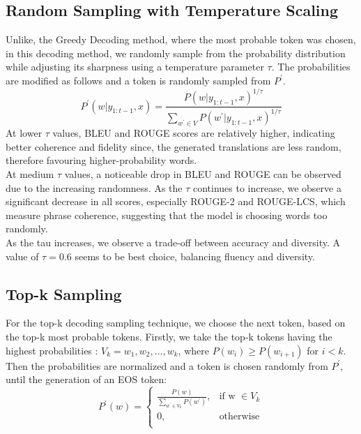 \documentclass{article}
\begin{document}
\subsection{Random Sampling with Temperature Scaling}
Unlike, the Greedy Decoding method, where the most probable token was chosen, in this decoding method, we randomly sample from the probability distribution while adjusting its sharpness using a temperature parameter $\tau$. The probabilities are modified as follows and a token is randomly sampled from $P^{'}$.
\begin{equation}
    P^{'} (w|y_{1:t-1}, x) = \frac{P(w|y_{1:t-1}, x)^{1/\tau}}{\sum_{w^{'}\in V}P(w^{'}|y_{1:t-1}, x)^{1/\tau}}
\end{equation}
At lower $\tau$ values, BLEU and ROUGE scores are relatively higher, indicating better coherence and fidelity since, the generated translations are less random, therefore favouring higher-probability words.\\
At medium $\tau$ values, a noticeable drop in BLEU and ROUGE can be observed due to the increasing randomness. As the $\tau$ continues to increase, we observe a significant decrease in all scores, especially ROUGE-2 and ROUGE-LCS, which measure phrase coherence, suggesting that the model is choosing words too randomly.\\
As the tau increases, we observe a trade-off between accuracy and diversity. A value of \textbf{$\tau = 0.6$} seems to be best choice, balancing fluency and diversity.

\subsection{Top-k Sampling}
For the top-k decoding sampling technique, we choose the next token, based on the top-k most probable tokens. Firstly, we take the top-k tokens having the highest probabilities : $V_k = {w_1, w_2, ..., w_k}$, where $P(w_i) \geq P(w_{i+1})$ for $i < k$. Then the probabilities are normalized and a token is chosen randomly from $P^{'}$, until the generation of an EOS token:
\begin{equation}
    P^{'}(w) = 
    \begin{cases}
        \frac{P(w)}{\sum_{w^{'} \in V_k} P(w^{'})}, & \text{if w $\in V_k$} \\
        0, & \text{otherwise}\\
    \end{cases}    
\end{equation}
\end{document}
